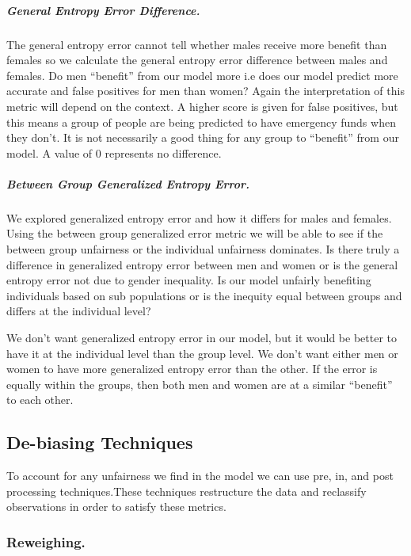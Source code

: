 \documentclass[water,article,submit,moreauthors,pdftex]{mdpi}
\begin{document}
\hypertarget{general-entropy-error-difference.}{%
\subparagraph{General Entropy Error
Difference.}\label{general-entropy-error-difference.}}

The general entropy error cannot tell whether males receive more benefit
than females so we calculate the general entropy error difference
between males and females. Do men ``benefit'' from our model more i.e
does our model predict more accurate and false positives for men than
women? Again the interpretation of this metric will depend on the
context. A higher score is given for false positives, but this means a
group of people are being predicted to have emergency funds when they
don't. It is not necessarily a good thing for any group to ``benefit''
from our model. A value of 0 represents no difference.

\hypertarget{between-group-generalized-entropy-error.}{%
\subparagraph{Between Group Generalized Entropy
Error.}\label{between-group-generalized-entropy-error.}}

We explored generalized entropy error and how it differs for males and
females. Using the between group generalized error metric we will be
able to see if the between group unfairness or the individual unfairness
dominates. Is there truly a difference in generalized entropy error
between men and women or is the general entropy error not due to gender
inequality. Is our model unfairly benefiting individuals based on sub
populations or is the inequity equal between groups and differs at the
individual level?

We don't want generalized entropy error in our model, but it would be
better to have it at the individual level than the group level. We don't
want either men or women to have more generalized entropy error than the
other. If the error is equally within the groups, then both men and
women are at a similar ``benefit'' to each other.

\hypertarget{de-biasing-techniques}{%
\subsection{De-biasing Techniques}\label{de-biasing-techniques}}

To account for any unfairness we find in the model we can use pre, in,
and post processing techniques.These techniques restructure the data and
reclassify observations in order to satisfy these metrics.

\hypertarget{reweighing.}{%
\subsubsection{Reweighing.}\label{reweighing.}}
\end{document}
